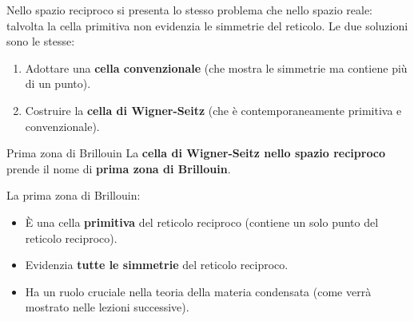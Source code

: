 Nello spazio reciproco si presenta lo stesso problema che nello spazio reale: talvolta la cella primitiva non evidenzia le simmetrie del reticolo. Le due soluzioni sono le stesse:

\begin{enumerate}
    \item Adottare una \textbf{cella convenzionale} (che mostra le simmetrie ma contiene più di un punto).
    \item Costruire la \textbf{cella di Wigner-Seitz} (che è contemporaneamente primitiva e convenzionale).
\end{enumerate}

\begin{definizione}{Prima zona di Brillouin}
La \textbf{cella di Wigner-Seitz nello spazio reciproco} prende il nome di \textbf{prima zona di Brillouin}.
\end{definizione}

La prima zona di Brillouin:
\begin{itemize}
    \item È una cella \textbf{primitiva} del reticolo reciproco (contiene un solo punto del reticolo reciproco).
    \item Evidenzia \textbf{tutte le simmetrie} del reticolo reciproco.
    \item Ha un ruolo cruciale nella teoria della materia condensata (come verrà mostrato nelle lezioni successive).
\end{itemize}
